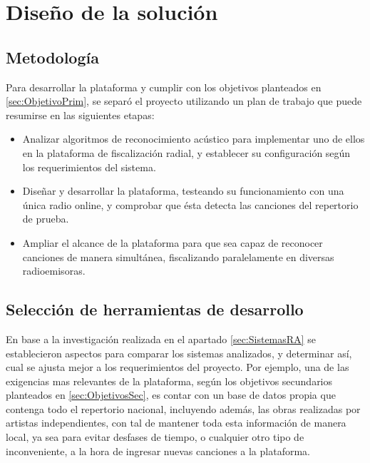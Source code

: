 
\chapter{Diseño de la solución}

\section{Metodología} \label{sec:Metodologia}



Para desarrollar la plataforma y cumplir con los objetivos planteados en \ref{sec:ObjetivoPrim}, se separó el proyecto utilizando un plan de trabajo que puede resumirse en las siguientes etapas:

\begin{itemize}
\item Analizar algoritmos de reconocimiento acústico para implementar uno de ellos en la plataforma de fiscalización radial, y establecer su configuración según los requerimientos del sistema.

\item Diseñar y desarrollar la plataforma, testeando su funcionamiento con una única radio online, y comprobar que ésta detecta las canciones del repertorio de prueba.

\item Ampliar el alcance de la plataforma para que sea capaz de reconocer canciones de manera simultánea, fiscalizando paralelamente en diversas radioemisoras.
\end{itemize}

\section{Selección de herramientas de desarrollo} \label{sec:SeleccionHerramientas}

En base a la investigación realizada en el apartado \ref{sec:SistemasRA} se establecieron \NumElemTablaComparativaAPIS{} aspectos para comparar los sistemas analizados, y determinar así, cual se ajusta mejor a los requerimientos del proyecto. Por ejemplo, una de las exigencias mas relevantes de la plataforma, según los objetivos secundarios planteados en \ref{sec:ObjetivosSec}, es contar con un base de datos propia que contenga todo el repertorio nacional, incluyendo además, las obras realizadas por artistas independientes, con tal de mantener toda esta información de manera local, ya sea para evitar desfases de tiempo, o cualquier otro tipo de inconveniente, a la hora de ingresar nuevas canciones a la plataforma.

